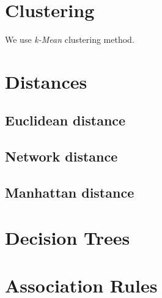 \section{Clustering}
We use \emph{k-Mean} clustering method.

\section{Distances}
\subsection{Euclidean distance}
\subsection{Network distance}
\subsection{Manhattan distance}

\section{Decision Trees}

\section{Association Rules}


